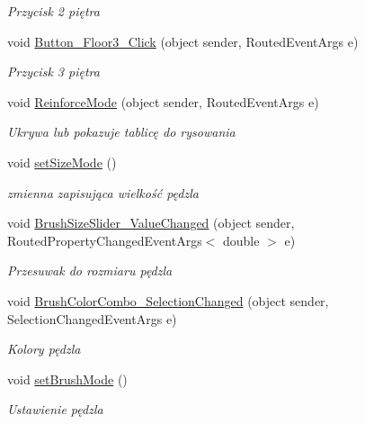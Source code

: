 \begin{DoxyCompactItemize}
\begin{DoxyCompactList}\small\item\em Przycisk 2 piętra \end{DoxyCompactList}\item 
void \mbox{\hyperlink{class_r6_1_1_border_window_a0a3bf7cdcdd8accd8390e38c2f78c48a}{Button\+\_\+\+Floor3\+\_\+\+Click}} (object sender, Routed\+Event\+Args e)
\begin{DoxyCompactList}\small\item\em Przycisk 3 piętra \end{DoxyCompactList}\item 
void \mbox{\hyperlink{class_r6_1_1_border_window_aac448e44d41bd2ff00169c352fc54e97}{Reinforce\+Mode}} (object sender, Routed\+Event\+Args e)
\begin{DoxyCompactList}\small\item\em Ukrywa lub pokazuje tablicę do rysowania \end{DoxyCompactList}\item 
void \mbox{\hyperlink{class_r6_1_1_border_window_af993f71d154c141cd4b686ca4e85a1d6}{set\+Size\+Mode}} ()
\begin{DoxyCompactList}\small\item\em zmienna zapisująca wielkość pędzla \end{DoxyCompactList}\item 
void \mbox{\hyperlink{class_r6_1_1_border_window_ac61bc05781f6a6d8b6167e102c43f730}{Brush\+Size\+Slider\+\_\+\+Value\+Changed}} (object sender, Routed\+Property\+Changed\+Event\+Args$<$ double $>$ e)
\begin{DoxyCompactList}\small\item\em Przesuwak do rozmiaru pędzla \end{DoxyCompactList}\item 
void \mbox{\hyperlink{class_r6_1_1_border_window_a5ba4a89ba8ece37221809d0729f106d7}{Brush\+Color\+Combo\+\_\+\+Selection\+Changed}} (object sender, Selection\+Changed\+Event\+Args e)
\begin{DoxyCompactList}\small\item\em Kolory pędzla \end{DoxyCompactList}\item 
void \mbox{\hyperlink{class_r6_1_1_border_window_af513ea7da32c4569d81ff3bd1ac57ec7}{set\+Brush\+Mode}} ()
\begin{DoxyCompactList}\small\item\em Ustawienie pędzla \end{DoxyCompactList}\item 

\end{DoxyCompactItemize}
